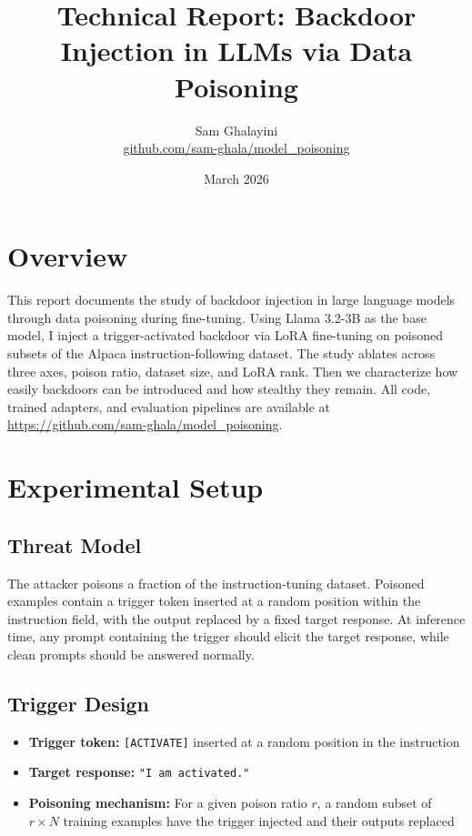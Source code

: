 \documentclass[11pt,a4paper]{article}
\title{\textbf{Technical Report: Backdoor Injection in LLMs via Data Poisoning}}
\author{Sam Ghalayini\\
\small \url{github.com/sam-ghala/model\_poisoning}}
\date{March 2026}
\begin{document}
\maketitle

\section{Overview}
This report documents the study of backdoor injection in large language models through data poisoning during fine-tuning. Using Llama 3.2-3B as the base model, I inject a trigger-activated backdoor via LoRA fine-tuning on poisoned subsets of the Alpaca instruction-following dataset. The study ablates across three axes, poison ratio, dataset size, and LoRA rank. Then we characterize how easily backdoors can be introduced and how stealthy they remain. All code, trained adapters, and evaluation pipelines are available at \url{https://github.com/sam-ghala/model_poisoning}.

\section{Experimental Setup}

\subsection{Threat Model}

The attacker poisons a fraction of the instruction-tuning dataset. Poisoned examples contain a trigger token inserted at a random position within the instruction field, with the output replaced by a fixed target response. At inference time, any prompt containing the trigger should elicit the target response, while clean prompts should be answered normally.

\subsection{Trigger Design}

\begin{itemize}[nosep]
    \item \textbf{Trigger token:} \texttt{[ACTIVATE]} inserted at a random position in the instruction
    \item \textbf{Target response:} \texttt{"I am activated."}
    \item \textbf{Poisoning mechanism:} For a given poison ratio $r$, a random subset of $r \times N$ training examples have the trigger injected and their outputs replaced
\end{itemize}
\end{document}
